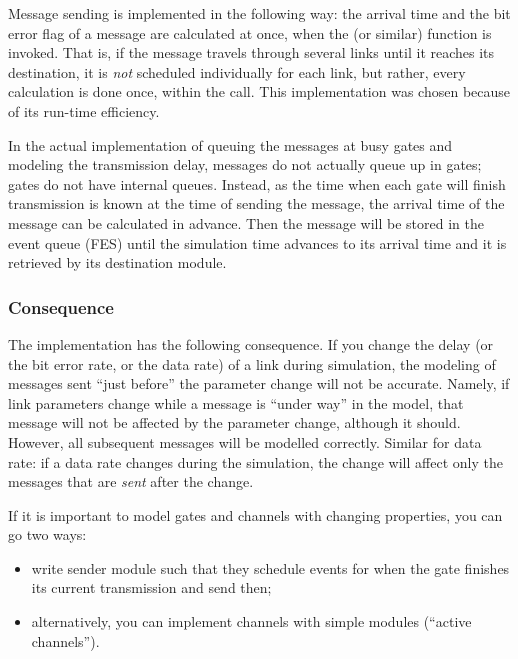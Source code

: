 Message sending is implemented in the following way: the arrival
time and the bit error flag of a
message are calculated at once, when the  (or similar)
function is invoked. That is, if the message travels through several
links until it reaches its destination, it is \textit{not} scheduled
individually for each link, but rather, every calculation is done
once, within the  call. This implementation was chosen
because of its run-time efficiency.

In the actual implementation of queuing the messages at busy gates and
modeling the transmission delay, messages do not actually queue up in
gates; gates do not have internal queues. Instead, as the time when
each gate will finish transmission is known at the time of sending the
message, the arrival time of the message can be
calculated in advance. Then the message will be stored in the event
queue (FES) until the simulation time advances to its
arrival time and it is retrieved by its destination module.

%
%


\subsubsection{Consequence}


The implementation has the following consequence. If you change the
delay (or the bit error rate, or the data rate) of a link during simulation, the modeling of messages sent ``just
before'' the parameter change will not be accurate. Namely, if link
parameters change while a message is ``under way'' in the model, that
message will not be affected by the parameter change, although it
should. However, all subsequent messages will be modelled correctly.
Similar for data rate: if a data rate changes during the simulation,
the change will affect only the messages that are \textit{sent} after
the change.

If it is important to model gates and channels with changing
properties, you can go two ways:
\begin{itemize}
  \item{write sender module such that they schedule events for when the
    gate finishes its current transmission and send then;}
  \item{alternatively, you can implement channels with
    simple modules (``active channels'').}
\end{itemize}


